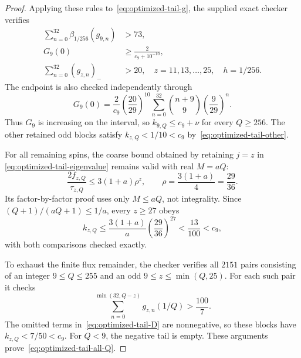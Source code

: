 \documentclass[11pt]{article}
\begin{document}
\begin{proof}
Applying these rules to~\eqref{eq:optimized-tail-g}, the supplied exact
checker verifies
\begin{align}
 \sum_{n=0}^{32}\beta_{1/256}(g_{9,n})&>73,
       \label{eq:optimized-tail-derivative}\\
 G_9(0)&\ge\frac2{c_9+10^{-10}},\label{eq:optimized-tail-endpoint}\\
 \sum_{n=0}^{32}(g_{z,n})_-&>20,
 \quad z=11,13,\ldots,25,\quad h=1/256.
 \label{eq:optimized-tail-other}
\end{align}
The endpoint is also checked independently through
\begin{equation}
 G_9(0)=\frac2{c_9}\left(\frac{20}{29}\right)^{10}
         \sum_{n=0}^{32}\binom{n+9}{9}\left(\frac9{29}\right)^n.
\end{equation}
Thus $G_9$ is increasing on the interval, so
$k_{9,Q}\le c_9+\nu$ for every $Q\ge256$. The other retained odd blocks
satisfy $k_{z,Q}<1/10<c_9$ by~\eqref{eq:optimized-tail-other}.

For all remaining spins, the coarse bound obtained by retaining $j=z$ in
\eqref{eq:optimized-tail-eigenvalue} remains valid with real $M=aQ$:
\begin{equation}
 \frac{2f_{z,Q}}{\tau_{z,Q}}\le3(1+a)\rho^z,
 \qquad\rho=\frac{3(1+a)}4=\frac{29}{36}.
\end{equation}
Its factor-by-factor proof uses only $M\le aQ$, not integrality. Since
$(Q+1)/(aQ+1)\le1/a$, every $z\ge27$ obeys
\begin{equation}\label{eq:optimized-tail-high}
 k_{z,Q}\le\frac{3(1+a)}a\left(\frac{29}{36}\right)^{27}
              <\frac{13}{100}<c_9,
\end{equation}
with both comparisons checked exactly.

To exhaust the finite flux remainder, the checker verifies all $2151$
pairs consisting of an integer $9\le Q\le255$ and an odd
$9\le z\le\min(Q,25)$. For each such pair it checks
\begin{equation}
 \sum_{n=0}^{\min(32,Q-z)}g_{z,n}(1/Q)>\frac{100}{7}.
\end{equation}
The omitted terms in~\eqref{eq:optimized-tail-D} are nonnegative, so these
blocks have $k_{z,Q}<7/50<c_9$. For $Q<9$, the negative tail
is empty. These arguments prove~\eqref{eq:optimized-tail-all-Q}.


\end{proof}
\end{document}
